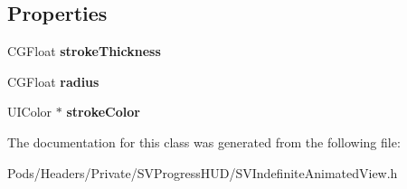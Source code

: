 \subsection*{Properties}
\begin{DoxyCompactItemize}
\item 
\mbox{\label{interface_s_v_indefinite_animated_view_a8570886fcbb3f71939828ebf4d47b07f}} 
C\+G\+Float {\bfseries stroke\+Thickness}
\item 
\mbox{\label{interface_s_v_indefinite_animated_view_a4a29c0f1b53f3bf71ceed1e54ad7072c}} 
C\+G\+Float {\bfseries radius}
\item 
\mbox{\label{interface_s_v_indefinite_animated_view_ae393c4d4f907b91c5d556f3e959a6271}} 
U\+I\+Color $\ast$ {\bfseries stroke\+Color}
\end{DoxyCompactItemize}


The documentation for this class was generated from the following file\+:\begin{DoxyCompactItemize}
\item 
Pods/\+Headers/\+Private/\+S\+V\+Progress\+H\+U\+D/S\+V\+Indefinite\+Animated\+View.\+h\end{DoxyCompactItemize}
